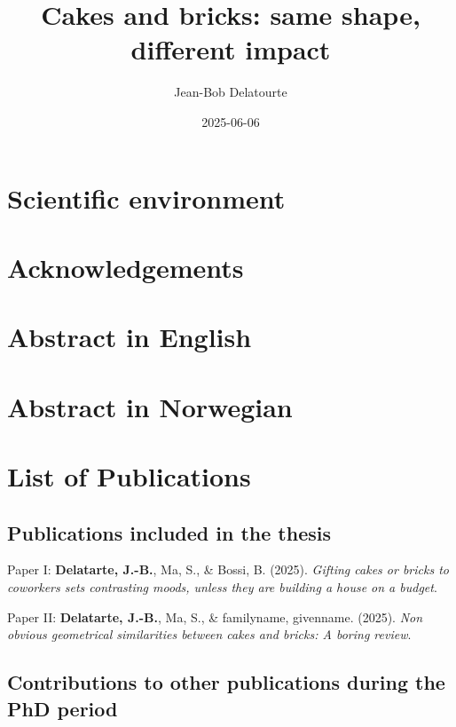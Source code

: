 \documentclass[
  letterpaper,
  DIV=11,
  numbers=noendperiod]{scrartcl}
\title{Cakes and bricks: same shape, different impact}
\author{Jean-Bob Delatourte}
\date{2025-06-06}
\newlength{\cslhangindent}
\newenvironment{CSLReferences}[2] %
 {\begin{list}{}{%
  \setlength{\itemindent}{0pt}
  \setlength{\leftmargin}{0pt}
  \setlength{\parsep}{0pt}
  \ifodd #1
   \setlength{\leftmargin}{\cslhangindent}
   \setlength{\itemindent}{-1\cslhangindent}
  \fi
  \setlength{\itemsep}{#2\baselineskip}}}
 {\end{list}}
\begin{document}
\maketitle


\section{Scientific environment}\label{scientific-environment}

\section{Acknowledgements}\label{acknowledgements}

\section{Abstract in English}\label{abstract-in-english}

\section{Abstract in Norwegian}\label{abstract-in-norwegian}

\section{List of Publications}\label{list-of-publications}

\subsection{Publications included in the
thesis}\label{publications-included-in-the-thesis}

\label{refs-papers}
\begin{CSLReferences}{1}{0}
Paper I: \textbf{Delatarte, J.-B.}, Ma, S., \& Bossi, B. (2025).
\emph{Gifting cakes or bricks to coworkers sets contrasting moods,
unless they are building a house on a budget}.

Paper II: \textbf{Delatarte, J.-B.}, Ma, S., \& familyname, givenname.
(2025). \emph{Non obvious geometrical similarities between cakes and
bricks: A boring review}.

\end{CSLReferences}

\subsection{Contributions to other publications during the PhD
period}\label{contributions-to-other-publications-during-the-phd-period}
\end{document}
